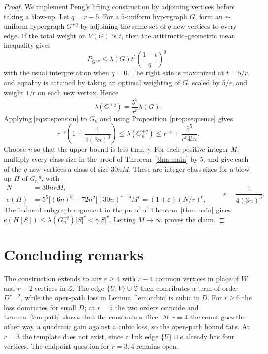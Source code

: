 \documentclass[11pt]{article}
\numberwithin{equation}{section}
\newcommand{\Z}{\mathcal Z}
\begin{document}
\begin{proof}
We implement Peng's lifting construction
\cite[proof of Theorem~1, p.~763]{Peng09} by adjoining vertices before
taking a blow-up. Let \(q=r-5\). For a
\(5\)-uniform hypergraph \(G\), form an
\(r\)-uniform hypergraph \(G^{+q}\) by adjoining the same set of
\(q\) new vertices to every edge. If the total weight on \(V(G)\) is
\(t\), then the arithmetic--geometric mean inequality gives
\[
 P_{G^{+q}}\le \lambda(G)t^{5}
 \left(\frac{1-t}{q}\right)^q,
\]
with the usual interpretation when \(q=0\). The right side is
maximized at \(t=5/r\), and equality is attained by taking an optimal
weighting of \(G\), scaled by \(5/r\), and weight \(1/r\) on each new
vertex. Hence
\begin{equation}\label{eq:suspension}
 \lambda(G^{+q})=\frac{5^{5}}{r^r}\lambda(G).
\end{equation}
Applying \eqref{eq:suspension} to \(G_n\) and using
Proposition~\ref{prop:sequence} gives
\[
 r^{-r}\left(1+\frac1{4(3n)^{3}}\right)
 \le \lambda(G_n^{+q})
 \le r^{-r}+\frac{5^{5}}{r^r4!n}.
\]
Choose \(n\) so that the upper bound is less than \(\gamma\).
For each positive integer \(M\), multiply every class size in the proof
of Theorem~\ref{thm:main} by \(5\), and give each of the \(q\) new
vertices a class of size \(30nM\). These are integer class sizes for
a blow-up \(H\) of \(G_n^{+q}\), with
\[
 \begin{split}
 N&=30nrM,\\
 e(H)&=5^5\bigl[(6n)^5+72n^2\bigr](30n)^{r-5}M^r
      =(1+\varepsilon)(N/r)^r,
 \end{split}
 \qquad \varepsilon=\frac1{4(3n)^3}.
\]
The induced-subgraph argument in the proof of Theorem~\ref{thm:main}
gives \(e(H[S])\le\lambda(G_n^{+q})|S|^r<\gamma|S|^r\).
Letting \(M\to\infty\) proves the claim.
\end{proof}

\section*{Concluding remarks}

The construction extends to any \(r\ge4\) with \(r-4\) common vertices
in place of \(W\) and \(r-2\) vertices in \(\Z\).
The edge \(\{U,V\}\cup\Z\) then contributes a term of order
\(D^{r-2}\), while the open-path loss in Lemma~\ref{lem:cubic}
is cubic in \(D\). For \(r\ge6\) the loss dominates for small \(D\);
at \(r=5\) the two orders coincide and Lemma~\ref{lem:path} shows
that the constants suffice. At \(r=4\) the count goes the other way,
a quadratic gain against a cubic loss, so the open-path bound fails.
At \(r=3\) the template does not exist, since a link edge
\(\{U\}\cup e\) already has four vertices.
The endpoint question for \(r=3,4\) remains open.
\end{document}

